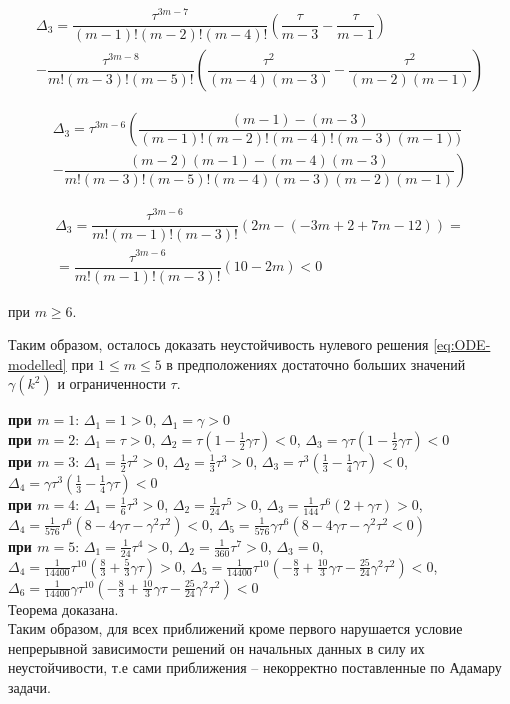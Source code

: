 \begin{multline*}
\Delta_3 = \dfrac{\tau^{3m-7}}{(m-1)!(m-2)!(m-4)!} \left( \dfrac{\tau}{m-3} - \dfrac{\tau}{m-1} \right) \\ - \dfrac{\tau^{3m-8}}{m!(m-3)!(m-5)!} \left( \dfrac{\tau^2}{(m-4)(m-3)} - \dfrac{\tau^2}{(m-2)(m-1)} \right)
\end{multline*}

\begin{multline*}
\Delta_3 = \tau^{3m-6} \left( \dfrac{(m-1) - (m-3)}{(m-1)!(m-2)!(m-4)!(m-3)(m-1))} \right. \\ \left. - \dfrac{(m-2)(m-1) - (m-4)(m-3)}{m!(m-3)!(m-5)!(m-4)(m-3)(m-2)(m-1)} \right)
\end{multline*}

\begin{align*}
\Delta_3 = \dfrac{\tau^{3m-6}}{m!(m-1)!(m-3)!} (2m - (-3m + 2 + 7m - 12)) =\\= \dfrac{\tau^{3m-6}}{m!(m-1)!(m-3)!} (10-2m) < 0
\end{align*}

при $m \geq 6$.

Таким образом, осталось доказать неустойчивость нулевого решения \ref{eq:ODE-modelled} при $1 \leq m \leq 5$ в предположениях достаточно больших значений $\gamma(k^2)$ и ограниченности $\tau$.

\textbf{при $m=1$}: $\Delta_1 = 1 > 0$, $\Delta_1 = \gamma > 0$\\

\textbf{при $m=2$}: $\Delta_1 = \tau > 0$, $\Delta_2 = \tau (1 - \frac{1}{2} \gamma \tau) < 0$, $\Delta_3 = \gamma \tau (1 - \frac{1}{2} \gamma \tau) < 0$\\

\textbf{при $m=3$}: $\Delta_1 = \frac{1}{2} \tau ^2 > 0$, $\Delta_2 = \frac{1}{3} \tau ^3 > 0$, $\Delta_3 = \tau ^3 (\frac{1}{3} - \frac{1}{4} \gamma  \tau ) < 0$, $\Delta_4 = \gamma  \tau ^3 (\frac{1}{3} - \frac{1}{4} \gamma  \tau ) < 0$\\

\textbf{при $m=4$}: $\Delta_1 = \frac{1}{6} \tau ^3 > 0$, $\Delta_2 = \frac{1}{24} \tau ^5 > 0$, $\Delta_3 = \frac{1}{144} \tau^6 (2+\gamma \tau) > 0$, $\Delta_4 = \frac{1}{576} \tau^6 (8 - 4 \gamma \tau - \gamma^2 \tau^2 ) < 0$, $\Delta_5 = \frac{1}{576} \gamma \tau^6 (8 - 4 \gamma \tau - \gamma^2 \tau^2 < 0)$\\

\textbf{при $m=5$}: $\Delta_1 = \frac{1}{24} \tau^4 > 0$, $\Delta_2 = \frac{1}{360} \tau^7 > 0$, $\Delta_3 = 0$,\\$\Delta_4 = \frac{1}{14400} \tau^{10} (\frac{8}{3} + \frac{5}{3} \gamma \tau) > 0$, $\Delta_5 = \frac{1}{14400} \tau^{10} (-\frac{8}{3} + \frac{10}{3} \gamma \tau - \frac{25}{24} \gamma^2 \tau^2) < 0$, $\Delta_6 = \frac{1}{14400} \gamma \tau^{10} (-\frac{8}{3} + \frac{10}{3} \gamma \tau - \frac{25}{24} \gamma^2 \tau^2) < 0$\\

Теорема доказана.\\

Таким образом, для всех приближений кроме первого нарушается условие непрерывной зависимости решений он начальных данных в силу их неустойчивости, т.е сами приближения \--- некорректно поставленные по Адамару задачи.
